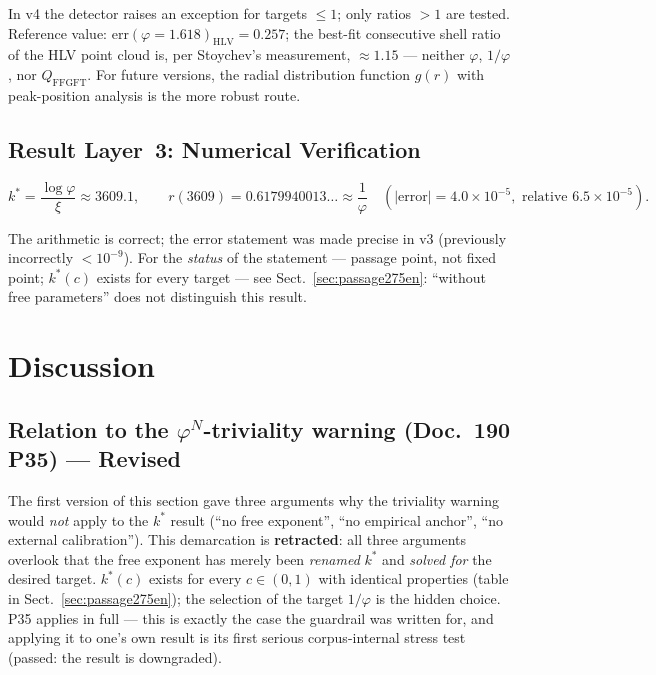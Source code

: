 In v4 the detector raises an exception for targets $\leq 1$; only
ratios $>1$ are tested. Reference value:
$\mathrm{err}(\varphi{=}1.618)_\mathrm{HLV} = 0.257$; the best-fit
consecutive shell ratio of the HLV point cloud is, per Stoychev's
measurement, $\approx 1.15$ --- neither $\varphi$, $1/\varphi$, nor
$Q_\mathrm{FFGFT}$. For future versions, the radial distribution
function $g(r)$ with peak-position analysis is the more robust route.

\subsection{Result Layer~3: Numerical Verification}

\begin{equation}
  k^* = \frac{\log\varphi}{\xi} \approx 3609.1,
  \qquad
  r(3609) = 0.6179940013\ldots \approx \frac{1}{\varphi}
  \quad (|\text{error}| = 4.0\times10^{-5},
  \text{ relative } 6.5\times10^{-5}).
\end{equation}

The arithmetic is correct; the error statement was made precise in v3
(previously incorrectly $<10^{-9}$). For the \emph{status} of the
statement --- passage point, not fixed point; $k^*(c)$ exists for every
target --- see Sect.~\ref{sec:passage275en}: \enquote{without free
parameters} does not distinguish this result.

\section{Discussion}

\subsection{Relation to the $\varphi^N$-triviality warning (Doc.~190 P35) --- Revised}

\begin{remark}
The first version of this section gave three arguments why the
triviality warning would \emph{not} apply to the $k^*$ result
(\enquote{no free exponent}, \enquote{no empirical anchor},
\enquote{no external calibration}). This demarcation is
\textbf{retracted}: all three arguments overlook that the free
exponent has merely been \emph{renamed} $k^*$ and \emph{solved for}
the desired target. $k^*(c)$ exists for every $c\in(0,1)$ with
identical properties (table in Sect.~\ref{sec:passage275en}); the
selection of the target $1/\varphi$ is the hidden choice. P35 applies
in full --- this is exactly the case the guardrail was written for,
and applying it to one's own result is its first serious
corpus-internal stress test (passed: the result is downgraded).
\end{remark}


